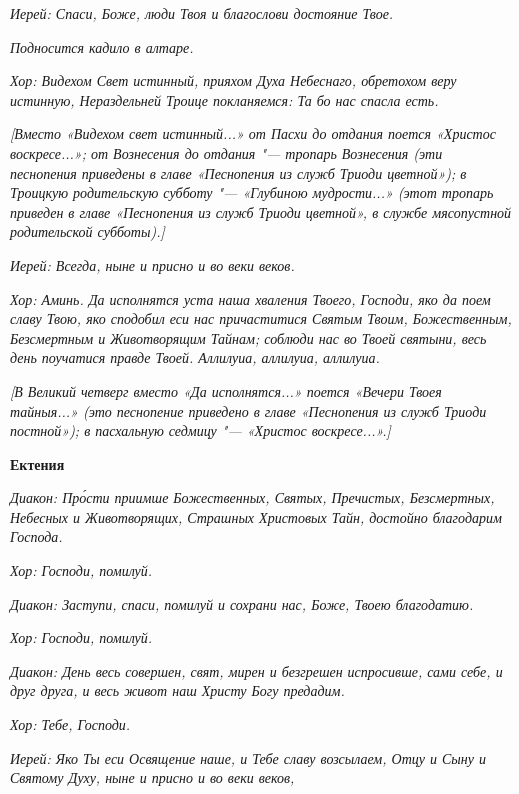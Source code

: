 \itshape Иерей:\normalfont{} Спаси, Боже, люди Твоя и благослови достояние Твое.


\itshape Подносится кадило в алтаре.\normalfont{}


\itshape Хор:\normalfont{} Видехом Свет истинный, прияхом Духа Небеснаго, обретохом веру истинную, Нераздельней Троице покланяемся: Та бо нас спасла есть.


\itshape [Вместо «Видехом свет истинный...» от Пасхи до отдания поется «Христос воскресе...»; от Вознесения до отдания "--- тропарь Вознесения (эти песнопения приведены в главе «Песнопения из служб Триоди цветной»); в Троицкую родительскую субботу "--- «Глубиною мудрости...» (этот тропарь приведен в главе «Песнопения из служб Триоди цветной», в службе мясопустной родительской субботы).]\normalfont{}


\itshape Иерей:\normalfont{} Всегда, ныне и присно и во веки веков.


\itshape Хор:\normalfont{} Аминь. Да исполнятся уста наша хваления Твоего, Господи, яко да поем славу Твою, яко сподобил еси нас причаститися Святым Твоим, Божественным, Безсмертным и Животворящим Тайнам; соблюди нас во Твоей святыни, весь день поучатися правде Твоей. Аллилуиа, аллилуиа, аллилуиа.


\itshape [В Великий четверг вместо «Да исполнятся...» поется «Вечери Твоея тайныя...» (это песнопение приведено в главе «Песнопения из служб Триоди постной»); в пасхальную седмицу "--- «Христос воскресе...».]\normalfont{}





\bfseries Ектения\normalfont{}


\itshape Диакон:\normalfont{} Про́сти приимше Божественных, Святых, Пречистых, Безсмертных, Небесных и Животворящих, Страшных Христовых Тайн, достойно благодарим Господа.


\itshape Хор:\normalfont{} Господи, помилуй.


\itshape Диакон:\normalfont{} Заступи, спаси, помилуй и сохрани нас, Боже, Твоею благодатию.


\itshape Хор:\normalfont{} Господи, помилуй.


\itshape Диакон:\normalfont{} День весь совершен, свят, мирен и безгрешен испросивше, сами себе, и друг друга, и весь живот наш Христу Богу предадим.


\itshape Хор:\normalfont{} Тебе, Господи.


\itshape Иерей:\normalfont{} Яко Ты еси Освящение наше, и Тебе славу возсылаем, Отцу и Сыну и Святому Духу, ныне и присно и во веки веков,


